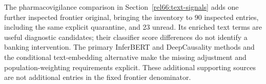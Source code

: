 The pharmacovigilance comparison in Section~\ref{rel66:text-signals}
adds one further inspected frontier original, bringing the inventory to
90 inspected entries, including the same explicit quarantine, and 23 unread.
Its enriched text terms are useful diagnostic candidates; their classifier
score differences do not identify a banking intervention. The primary
InferBERT and DeepCausality methods and the conditional text-embedding
alternative make the missing adjustment and population-weighting requirements
explicit. These additional supporting sources are not additional entries in
the fixed frontier denominator. \citep{rel66pharma,rel66inferbert,rel66deepcausality,rel66veitch}




